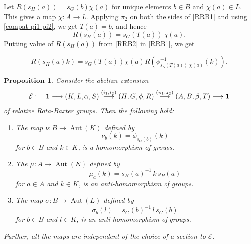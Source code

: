 \documentclass[11pt]{amsart}
\theoremstyle{thrm}
\theoremstyle{plain}
\newtheorem{prop}[thm]{Proposition}
\theoremstyle{definition}
\newcommand{\Aut}{\operatorname{Aut} }
\numberwithin{equation}{section}
\begin{document}
Let $R(s_H(a))=s_G(b)  \chi(a) $ for unique elements $b \in B$ and $\chi(a) \in L$. This gives a map $\chi:A \longrightarrow L$. Applying $\pi_2$ on both the sides of \eqref{RRB1} and using \eqref{compat pi1 pi2}, we get $T(a)=b$, and hence
\begin{equation}\label{RRB2}
R(s_H(a)) = s_G(T(a))  ~ \chi(a).
\end{equation}
Putting  value of $R(s_H(a))$ from \eqref{RRB2} in \eqref{RRB1}, we get

\begin{equation}\label{relativecon}
	R( s_H(a)   k  )  =   s_G(T(a))  \chi(a) R(\phi^{-1}_{ s_G(T(a)) \;  \chi(a)}( k)).
\end{equation}

\begin{prop}\label{construction of actions}
Consider the abelian extension 
$$\mathcal{E} : \quad  {\bf 1} \longrightarrow (K,L, \alpha,S ) \stackrel{(i_1, i_2)}{\longrightarrow}  (H,G, \phi, R) \stackrel{(\pi_1, \pi_2)}{\longrightarrow} (A,B, \beta, T) \longrightarrow {\bf 1}$$
of relative Rota-Baxter groups. Then the following hold:
\begin{enumerate}
\item  The map  $\nu: B \rightarrow \Aut(K)$ defined by 
\begin{equation}\label{nuact}
\nu_b(k)= \phi_{s_G(b)}(k)
\end{equation}
 for $b \in B$ and $k \in K$, is a homomorphism of groups.
 \item  The $\mu: A \rightarrow \Aut(K)$ defined by 
\begin{equation}\label{muact}
\mu_a(k)=s_H(a)^{-1}\, k\, s_H(a)
\end{equation}
 for $a \in A$ and $ k \in K$, is an anti-homomorphism of groups.
\item The map $\sigma: B \rightarrow \Aut(L)$ defined by 
\begin{equation}\label{sigmaact}
\sigma_b(l)=s_G(b)^{-1}\,l\, s_G(b)
\end{equation}
 for $b \in B$ and $ l \in K$, is an anti-homomorphism of groups.
\end{enumerate}
Further, all the maps are independent of the choice of a section to $\mathcal{E}$.
\end{prop}
\end{document}
